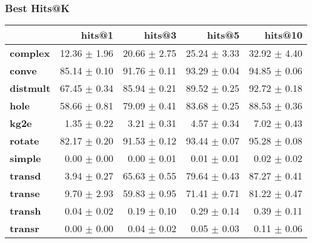 \documentclass{article}
\begin{document}
    \subsubsection{Best Hits@K}
    \begin{center}
    \begin{tabular}{lrrrr}
\toprule
{} &        hits@1 &        hits@3 &        hits@5 &       hits@10 \\
\midrule
\textbf{complex } &  12.36 $\pm$ 1.96 &  20.66 $\pm$ 2.75 &  25.24 $\pm$ 3.33 &  32.92 $\pm$ 4.40 \\
\textbf{conve   } &  85.14 $\pm$ 0.10 &  91.76 $\pm$ 0.11 &  93.29 $\pm$ 0.04 &  94.85 $\pm$ 0.06 \\
\textbf{distmult} &  67.45 $\pm$ 0.34 &  85.94 $\pm$ 0.21 &  89.52 $\pm$ 0.25 &  92.72 $\pm$ 0.18 \\
\textbf{hole    } &  58.66 $\pm$ 0.81 &  79.09 $\pm$ 0.41 &  83.68 $\pm$ 0.25 &  88.53 $\pm$ 0.36 \\
\textbf{kg2e    } &   1.35 $\pm$ 0.22 &   3.21 $\pm$ 0.31 &   4.57 $\pm$ 0.34 &   7.02 $\pm$ 0.43 \\
\textbf{rotate  } &  82.17 $\pm$ 0.20 &  91.53 $\pm$ 0.12 &  93.44 $\pm$ 0.07 &  95.28 $\pm$ 0.08 \\
\textbf{simple  } &   0.00 $\pm$ 0.00 &   0.00 $\pm$ 0.01 &   0.01 $\pm$ 0.01 &   0.02 $\pm$ 0.02 \\
\textbf{transd  } &   3.94 $\pm$ 0.27 &  65.63 $\pm$ 0.55 &  79.64 $\pm$ 0.43 &  87.27 $\pm$ 0.41 \\
\textbf{transe  } &   9.70 $\pm$ 2.93 &  59.83 $\pm$ 0.95 &  71.41 $\pm$ 0.71 &  81.22 $\pm$ 0.47 \\
\textbf{transh  } &   0.04 $\pm$ 0.02 &   0.19 $\pm$ 0.10 &   0.29 $\pm$ 0.14 &   0.39 $\pm$ 0.11 \\
\textbf{transr  } &   0.00 $\pm$ 0.00 &   0.04 $\pm$ 0.02 &   0.05 $\pm$ 0.03 &   0.11 $\pm$ 0.06 \\
\bottomrule
\end{tabular}

    \end{center}
\end{document}
